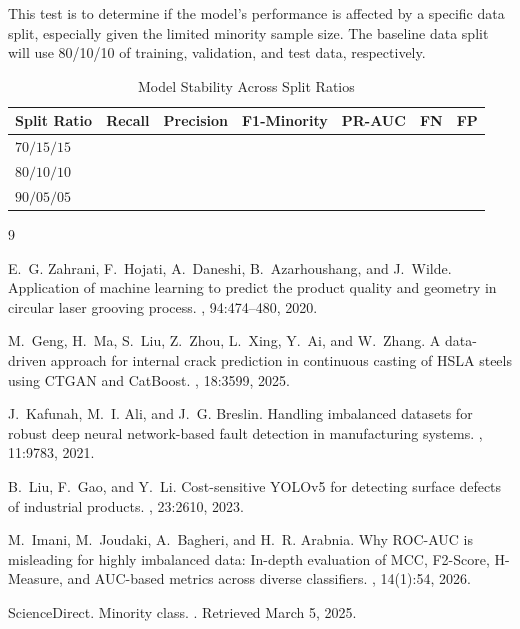 \documentclass{article}
\begin{document}
This test is to determine if the model’s performance is affected by a specific data split, especially given the limited minority sample size. The baseline data split will use 80/10/10 of training, validation, and test data, respectively.
 
\begin{table}[h]
\centering
\small
\begin{tabular}{|l|c|c|c|c|c|c|}
\hline
\textbf{Split Ratio} & \textbf{Recall} & \textbf{Precision} & \textbf{F1-Minority} & \textbf{PR-AUC} & \textbf{FN} & \textbf{FP} \\ \hline
$70/15/15$ & & & & & & \\ \hline
$80/10/10$ & & & & & & \\ \hline
$90/05/05$ & & & & & & \\ \hline
\end{tabular}
\caption{Model Stability Across Split Ratios}
\end{table}




\newpage


\begin{thebibliography}{9}

E.~G. Zahrani, F.~Hojati, A.~Daneshi, B.~Azarhoushang, and J.~Wilde.
\newblock Application of machine learning to predict the product quality and geometry in circular laser grooving process.
, 94:474--480, 2020.

M.~Geng, H.~Ma, S.~Liu, Z.~Zhou, L.~Xing, Y.~Ai, and W.~Zhang.
\newblock A data-driven approach for internal crack prediction in continuous casting of HSLA steels using CTGAN and CatBoost.
, 18:3599, 2025.

J.~Kafunah, M.~I. Ali, and J.~G. Breslin.
\newblock Handling imbalanced datasets for robust deep neural network-based fault detection in manufacturing systems.
, 11:9783, 2021.

B.~Liu, F.~Gao, and Y.~Li.
\newblock Cost-sensitive YOLOv5 for detecting surface defects of industrial products.
, 23:2610, 2023.

M.~Imani, M.~Joudaki, A.~Bagheri, and H.~R. Arabnia.
\newblock Why {ROC-AUC} is misleading for highly imbalanced data: In-depth
  evaluation of {MCC}, {F2-Score}, {H-Measure}, and {AUC}-based metrics across
  diverse classifiers.
, 14(1):54, 2026.

ScienceDirect.
\newblock Minority class.
.
\newblock Retrieved March 5, 2025.

\end{thebibliography}
\end{document}
